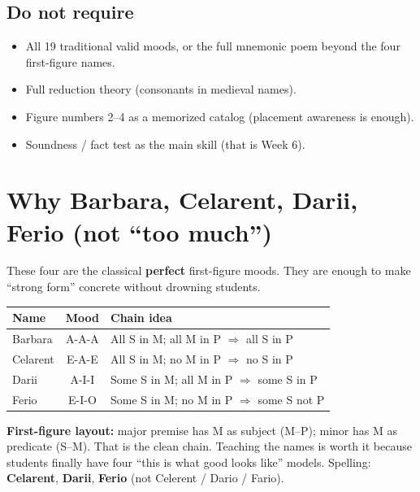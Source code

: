 \documentclass[11pt]{article}
\begin{document}
\subsection*{Do not require}
\begin{itemize}
\item All 19 traditional valid moods, or the full mnemonic poem beyond the four first-figure names.
\item Full reduction theory (consonants in medieval names).
\item Figure numbers 2--4 as a memorized catalog (placement awareness is enough).
\item Soundness / fact test as the main skill (that is Week 6).
\end{itemize}

\section{Why Barbara, Celarent, Darii, Ferio (not ``too much'')}
These four are the classical \textbf{perfect} first-figure moods. They are enough to make ``strong form'' concrete without drowning students.

\begin{center}
\begin{tabular}{|l|c|l|}
\hline
Name & Mood & Chain idea \\
\hline
Barbara & A-A-A & All S in M; all M in P $\Rightarrow$ all S in P \\
Celarent & E-A-E & All S in M; no M in P $\Rightarrow$ no S in P \\
Darii & A-I-I & Some S in M; all M in P $\Rightarrow$ some S in P \\
Ferio & E-I-O & Some S in M; no M in P $\Rightarrow$ some S not P \\
\hline
\end{tabular}
\end{center}

\vspace{0.3em}
\noindent\textbf{First-figure layout:} major premise has M as subject (M--P); minor has M as predicate (S--M). That is the clean chain. Teaching the names is worth it because students finally have four ``this is what good looks like'' models. Spelling: \textbf{Celarent}, \textbf{Darii}, \textbf{Ferio} (not Celerent / Dario / Fario).
\end{document}
